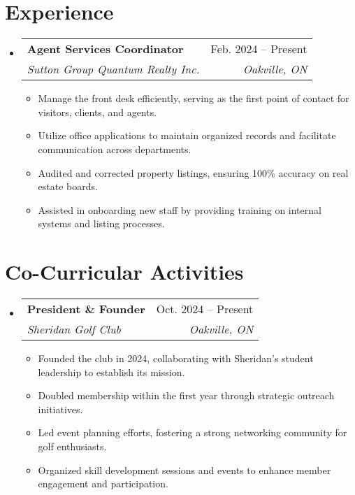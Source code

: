 \documentclass[letterpaper,11pt]{article}
\makeatletter
\newcommand{\resumeItem}[1]{
  \item\small{
    {#1 \vspace{-2pt}}
  }
}
\newcommand{\resumeSubheading}[4]{
  \vspace{-2pt}\item
    \begin{tabular*}{0.97\textwidth}[t]{l@{\extracolsep{\fill}}r}
      \textbf{#1} & #2 \\
      \textit{\small#3} & \textit{\small #4} \\
    \end{tabular*}\vspace{-7pt}
}
\newcommand{\resumeSubHeadingListStart}{\begin{itemize}[leftmargin=0.15in, label={}]}
\newcommand{\resumeSubHeadingListEnd}{\end{itemize}}
\newcommand{\resumeItemListStart}{\begin{itemize}}
\newcommand{\resumeItemListEnd}{\end{itemize}\vspace{-5pt}}
\makeatother
\begin{document}
\section{Experience}
\resumeSubHeadingListStart

    \resumeSubheading
        { Agent Services Coordinator }
        { Feb. 2024 – Present }
        { Sutton Group Quantum Realty Inc. }
        { Oakville, ON }
    \resumeItemListStart
        
            \resumeItem{ Manage the front desk efficiently, serving as the first point of contact for visitors, clients, and agents. }
        
            \resumeItem{ Utilize office applications to maintain organized records and facilitate communication across departments. }
        
            \resumeItem{ Audited and corrected property listings, ensuring 100\% accuracy on real estate boards. }
        
            \resumeItem{ Assisted in onboarding new staff by providing training on internal systems and listing processes. }
        
    \resumeItemListEnd

\resumeSubHeadingListEnd



\section{Co-Curricular Activities}
\resumeSubHeadingListStart

    \resumeSubheading
        { President \& Founder }
        { Oct. 2024 – Present }
        { Sheridan Golf Club }
        { Oakville, ON }
    \resumeItemListStart
        
            \resumeItem{ Founded the club in 2024, collaborating with Sheridan’s student leadership to establish its mission. }
        
            \resumeItem{ Doubled membership within the first year through strategic outreach initiatives. }
        
            \resumeItem{ Led event planning efforts, fostering a strong networking community for golf enthusiasts. }
        
            \resumeItem{ Organized skill development sessions and events to enhance member engagement and participation. }
        
    \resumeItemListEnd

\resumeSubHeadingListEnd
\end{document}
